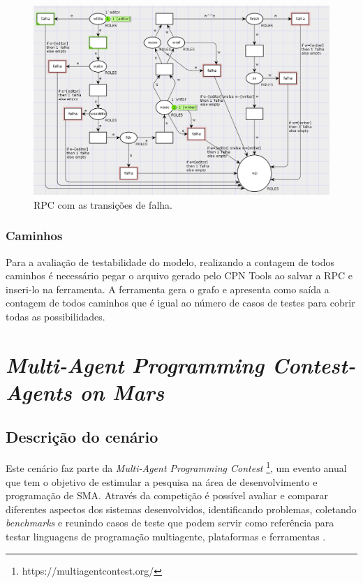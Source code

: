 \begin{figure}[ht]
\centering
\includegraphics[scale=0.55]{imagens/5-rpc-final1.PNG}
\caption{RPC com as transições de falha.}
\label{fig:5rpcfinal1}
\end{figure}

\subsubsection{Caminhos}

Para a avaliação de testabilidade do modelo, realizando a contagem de todos caminhos é necessário pegar o arquivo gerado pelo CPN Tools ao salvar a RPC e inseri-lo na ferramenta. A ferramenta gera o grafo e apresenta como saída a contagem de todos caminhos que é igual ao número de casos de testes para cobrir todas as possibilidades.

    
\section{\textit{Multi-Agent Programming Contest- Agents on Mars}}

\subsection{Descrição do cenário}

Este cenário faz parte da \textit{Multi-Agent Programming Contest} \footnote[1]{https://multiagentcontest.org/}, um evento anual que tem o objetivo de estimular a pesquisa na área de desenvolvimento e programação de SMA. Através da competição é possível avaliar e comparar diferentes aspectos dos sistemas desenvolvidos, identificando problemas, coletando \textit{benchmarks} e reunindo casos de teste que podem servir como referência para testar linguagens de programação multiagente, plataformas e ferramentas \cite{koster2012multi, ahlbrecht2013multi}.

